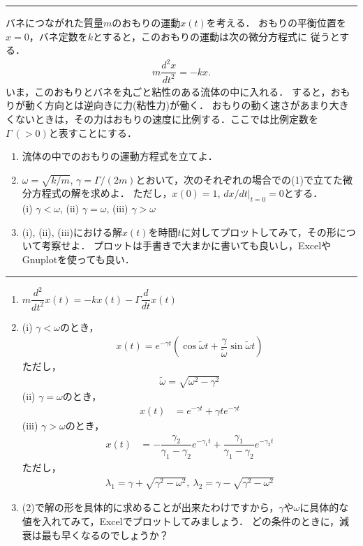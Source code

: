 \documentclass[11pt,a4]{jsarticle}
\numberwithin{equation}{section}
\begin{document}
\newpage
\vspace*{.2cm}
\hrule
\enshu
バネにつながれた質量$m$のおもりの運動$x(t)$を考える．
おもりの平衡位置を$x=0$，バネ定数を$k$とすると，このおもりの運動は次の微分方程式に
従うとする．
\begin{align*}
  m\dfrac{d^2x}{dt^2} = -k x. 
\end{align*}
いま，このおもりとバネを丸ごと粘性のある流体の中に入れる．
すると，おもりが動く方向とは逆向きに力(粘性力)が働く．
おもりの動く速さがあまり大きくないときは，その力はおもりの速度に比例する．ここでは比例定数を$\Gamma ~(>0)$と表すことにする．
\begin{enumerate}[(1)]
  \item 流体の中でのおもりの運動方程式を立てよ．
  \item $\omega=\sqrt{k/m}$, $\gamma = \Gamma/(2m)$とおいて，次のそれぞれの場合での(1)で立てた微分方程式の解を求めよ．
	ただし，$x(0)=1$, $dx/dt|_{t=0} = 0$とする．\\
	(i) $\gamma < \omega$, (ii) $\gamma = \omega$, (iii) $\gamma > \omega$
  \item (i), (ii), (iii)における解$x(t)$を時間$t$に対してプロットしてみて，その形について考察せよ．
	プロットは手書きで大まかに書いても良いし，ExcelやGnuplotを使っても良い．
\end{enumerate}
\vspace*{.2cm}
\hrule
%
\begin{enumerate}[(1)]
\item $m\dfrac{d^2}{dt^2}x(t) = -kx(t) -\Gamma \dfrac{d}{dt}x(t)$
\item (i) $\gamma < \omega$のとき，
%
\begin{align*}
 x\left(t\right) = e^{-\gamma t}\left(\cos \tilde{\omega}t + \dfrac{\gamma}{\tilde{\omega}}\sin \tilde{\omega}t\right) 
\end{align*}
ただし，
\begin{align*}
  \tilde{\omega} = \sqrt{\omega^2 - \gamma^2}
\end{align*}
%
(ii) $\gamma = \omega$のとき，
\begin{align*}
x\left(t\right) & =e^{-\gamma t}+\gamma te^{-\gamma t}
\end{align*}
%
(iii) $\gamma > \omega$のとき，
\begin{align*}
x\left(t\right) & =-\dfrac{\gamma_{2}}{\gamma_{1}-\gamma_{2}}e^{-\gamma_{1}t}+\dfrac{\gamma_{1}}{\gamma_{1}-\gamma_{2}}e^{-\gamma_{2}t}
\end{align*}
ただし，
\begin{align*}
  \lambda_1 = \gamma + \sqrt{\gamma^2 - \omega^2}, ~\lambda_2 = \gamma - \sqrt{\gamma^2 - \omega^2} 
\end{align*}
%
\item
%
(2)で解の形を具体的に求めることが出来たわけですから，$\gamma$や$\omega$に具体的な値を入れてみて，Excelでプロットしてみましょう．
どの条件のときに，減衰は最も早くなるのでしょうか？
\end{enumerate}
\end{document}
